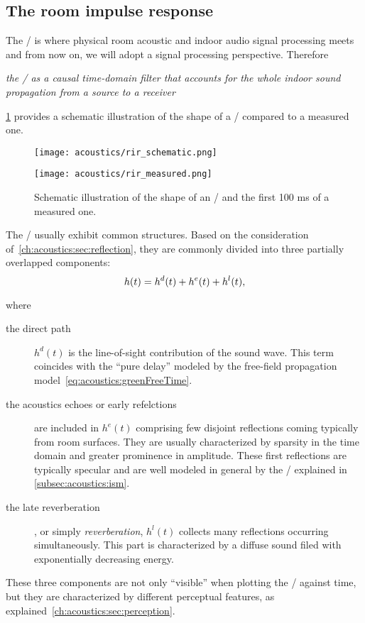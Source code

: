 \subsection{The room impulse response}\label{ch:acoustics:subsec:rir}
The \RIRdef/ is where physical room acoustic and indoor audio signal processing meets and from now on, we will adopt a signal processing perspective.
Therefore
\begin{center}
\textit{the \RIR/ as a causal time-domain filter that accounts for the whole indoor sound propagation
from a source to a receiver}
\end{center}
\cref{fig:acoustics:rir} provides a schematic illustration of the shape of a \RIR/ compared to a measured one.
\begin{figure}[h]
    \centering
    \begin{minipage}[b]{.5\textwidth}
        \centering
        \texttt{[image: acoustics/rir\_schematic.png]}
    \end{minipage}%
    \begin{minipage}[b]{.5\textwidth}
        \centering
        \texttt{[image: acoustics/rir\_measured.png]}
    \end{minipage}
    \caption{Schematic illustration of the shape of an \RIR/ and the first 100 ms of a measured one.}
    \label{fig:acoustics:rir}
\end{figure}

The \RIRs/ usually exhibit common structures.
Based on the consideration of~\cref{ch:acoustics:sec:reflection}, they are commonly divided into three partially overlapped components:
\begin{equation}\label{eq:acoustics:rir_full}
h(t) = h^d(t) + h^e(t) + h^l(t)
,
\end{equation}

where
\begin{description}
    \item[the direct path] $h^d(t)$ is the line-of-sight contribution of the sound wave.
    This term coincides with the ``pure delay'' modeled by the free-field propagation model~\eqref{eq:acoustics:greenFreeTime}.
    \item[the acoustics echoes or early refelctions] are included in $h^e(t)$ comprising few disjoint reflections coming typically from room surfaces.
    They are usually characterized by sparsity in the time domain and greater prominence in amplitude.
    These first reflections are typically specular and are well modeled in general by the \ISMdef/ explained in \cref{subsec:acoustics:ism}.
    \item[the late reverberation], or simply \textit{reverberation}, $h^l(t)$ collects many reflections occurring simultaneously.
    This part is characterized by a diffuse sound filed with exponentially decreasing energy.
\end{description}
These three components are not only ``visible'' when plotting the \RIR/ against time,
but they are characterized by different perceptual features, as explained~\cref{ch:acoustics:sec:perception}.

